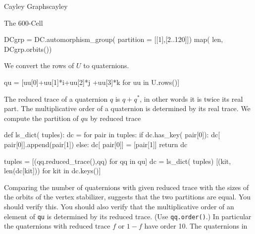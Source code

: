 \begin{chap}{Cayley Graphs}{cayley}
\begin{sect}{The 600-Cell}
\begin{sagecode}
\begin{sageinput}
DCgrp = DC.automorphism_group( partition = [[1],[2..120]])
map( len, DCgrp.orbits())
\end{sageinput}
\begin{sageoutput}
[12, 12, 20, 20, 12, 12, 1, 30, 1]
\end{sageoutput}
\end{sagecode}
%
\begin{para}
We convert the rows of $U$ to quaternions.
\end{para}
%
\begin{sagecode}
\begin{sageinput}
qu = [uu[0]+uu[1]*i+uu[2]*j +uu[3]*k for uu in U.rows()]
\end{sageinput}
\end{sagecode}
%
\begin{para}
The reduced trace of a quaternion $q$ is $q+q^*$, in other words it is
twice its real part. The multiplicative order of a quaternion is determined
by its real trace. We compute the partition of $qu$ by reduced trace
\end{para}
%
\begin{sagecode}
\begin{sageinput}
def ls_dict( tuples):
    dc = {} 
    for pair in tuples:
        if dc.has_key( pair[0]):
            dc[ pair[0]].append(pair[1])
        else:
            dc[ pair[0]] = [pair[1]]
    return dc
\end{sageinput}
\end{sagecode}
%
\begin{sagecode}
\begin{sageinput}
tuples = [(qq.reduced_trace(),qq) for qq in qu]
dc = ls_dict( tuples)
[(kit, len(dc[kit])) for kit in dc.keys()]
\end{sageinput}
\begin{sageoutput}
[(0, 30), (1, 20), (2, 1), (-f, 12), (-f + 1, 12), 
(f - 1, 12), (f, 12), (-2, 1), (-1, 20)]
\end{sageoutput}
\end{sagecode}
%
\begin{para}
Comparing the number of quaternions with given reduced trace with the
sizes of the orbits of the vertex stabilizer, suggests that the two partitions
are equal. You should verify this. You should also verify that the
multiplicative order of an element of \verb|qu| is determined by its 
reduced trace. (Use \verb|qq.order()|.) In particular the quaternions
with reduced trace $f$ or $1-f$ have order 10. The quaternions in

\end{para}
\end{sect}
\end{chap}
